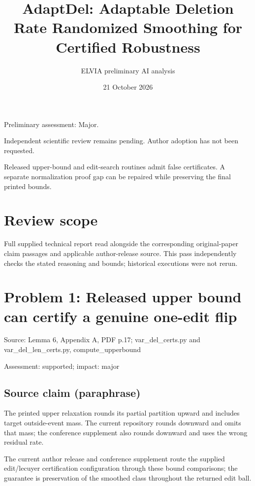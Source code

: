 \documentclass[11pt]{article}
\begin{document}
\title{AdaptDel: Adaptable Deletion Rate Randomized Smoothing for Certified Robustness}

\author{ELVIA preliminary AI analysis}\date{21 October 2026}\maketitle

Preliminary assessment: Major.\par

Independent scientific review remains pending. Author adoption has not been requested.

Released upper-bound and edit-search routines admit false certificates. A separate normalization proof gap can be repaired while preserving the final printed bounds.

\section*{Review scope}

Full supplied technical report read alongside the corresponding original-paper claim passages and applicable author-release source. This pass independently checks the stated reasoning and bounds; historical executions were not rerun.

\section*{Problem 1: Released upper bound can certify a genuine one-edit flip}

Source: Lemma 6, Appendix A, PDF p.17; var\_del\_certs.py and var\_del\_len\_certs.py, compute\_upperbound

Assessment: supported; impact: major

\subsection*{Source claim (paraphrase)}

The printed upper relaxation rounds its partial partition upward and includes target outside-event mass. The current repository rounds downward and omits that mass; the conference supplement also rounds downward and uses the wrong residual rate.

The current author release and conference supplement route the supplied edit/lecuyer certification configuration through these bound comparisons; the guarantee is preservation of the smoothed class throughout the returned edit ball.
\end{document}
